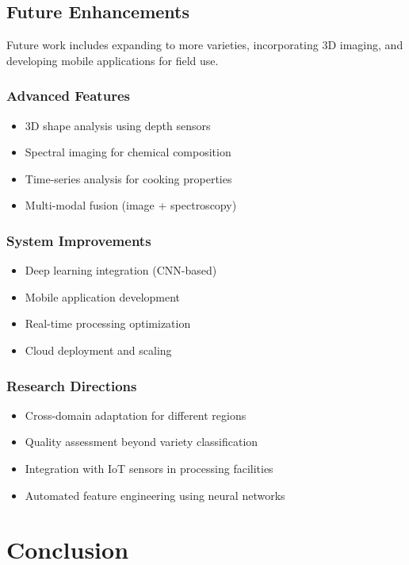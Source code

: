 \documentclass[conference]{IEEEtran}
\begin{document}
\subsection{Future Enhancements}

Future work includes expanding to more varieties, incorporating 3D imaging, and developing mobile applications for field use.

\subsubsection{Advanced Features}
\begin{itemize}
    \item 3D shape analysis using depth sensors
    \item Spectral imaging for chemical composition
    \item Time-series analysis for cooking properties
    \item Multi-modal fusion (image + spectroscopy)
\end{itemize}

\subsubsection{System Improvements}
\begin{itemize}
    \item Deep learning integration (CNN-based)
    \item Mobile application development
    \item Real-time processing optimization
    \item Cloud deployment and scaling
\end{itemize}

\subsubsection{Research Directions}
\begin{itemize}
    \item Cross-domain adaptation for different regions
    \item Quality assessment beyond variety classification
    \item Integration with IoT sensors in processing facilities
    \item Automated feature engineering using neural networks
\end{itemize}

\section{Conclusion}
\end{document}
